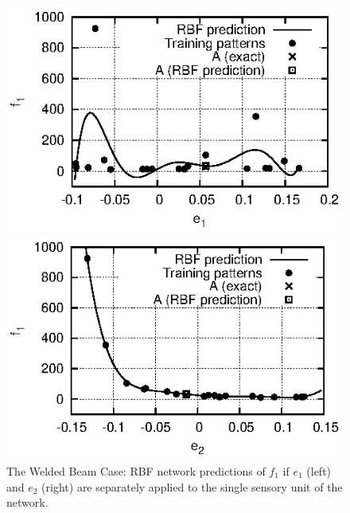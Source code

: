 \begin{figure}
\begin{minipage}{0.48\textwidth}
\includegraphics[scale=1.2]{IPE/f1_e1.eps}
\end{minipage}
\begin{minipage}{0.48\textwidth}
\includegraphics[scale=1.2]{IPE/f1_e2.eps}
\end{minipage}
\caption{The Welded Beam Case: RBF network predictions of $f_1$ if $e_1$ (left) and $e_2$ (right) are separately applied to the single sensory unit of the network.}
\label{fig:f1e1e2}
\end{figure}

